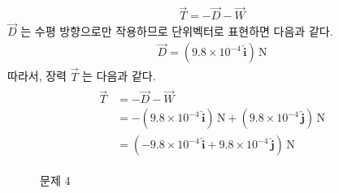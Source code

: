 \documentclass[floatfix,nofootinbib,superscriptaddress,fleqn,preprint]{revtex4}
\begin{document}
\begin{itemize}
\begin{align}
  \vec{T} = -\vec{D}-\vec{W}
\end{align}
$\vec{D}$ 는 수평 방향으로만 작용하므로 단위벡터로 표현하면 다음과 같다.
\begin{align}
  \vec{D} = (9.8\times 10^{-4}\,\hat{\bm{i}})\,\mathrm{N}
\end{align}
따라서, 장력 $\vec{T}$ 는 다음과 같다.
\begin{align}
  \begin{split}
    \vec{T} &= -\vec{D}-\vec{W} \\
    &=-(9.8\times 10^{-4}\,\hat{\bm{i}})\,\mathrm{N}
    +(9.8\times 10^{-4}\,\hat{\bm{j}})\,\mathrm{N}  \\
    &=(-9.8\times 10^{-4}\,\hat{\bm{i}}
    +9.8\times 10^{-4}\,\hat{\bm{j}})\,\mathrm{N}
  \end{split}
\end{align}

\begin{figure}[ht]
    \caption{문제 4} 
    \label{fig:4}
  \end{figure}
\end{itemize}
\end{document}
